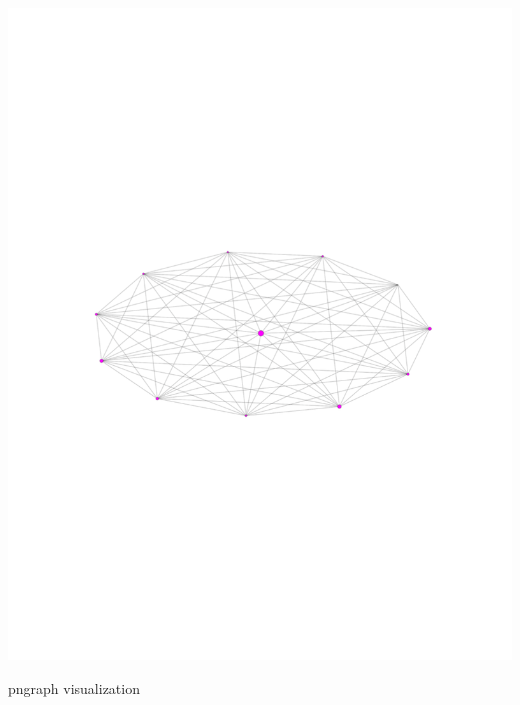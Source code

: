 \documentclass[landscape,paperwidth=70in,paperheight=46in,fontscale=0.225]{baposter} %
\begin{document}
\begin{poster}
{\begin{minipage}{0.48\linewidth}
\includegraphics[scale=0.3]{figures/graph_community.pdf} 
\end{minipage}

\vspace{5mm}
pngraph visualization

}
\end{poster}
\end{document}
